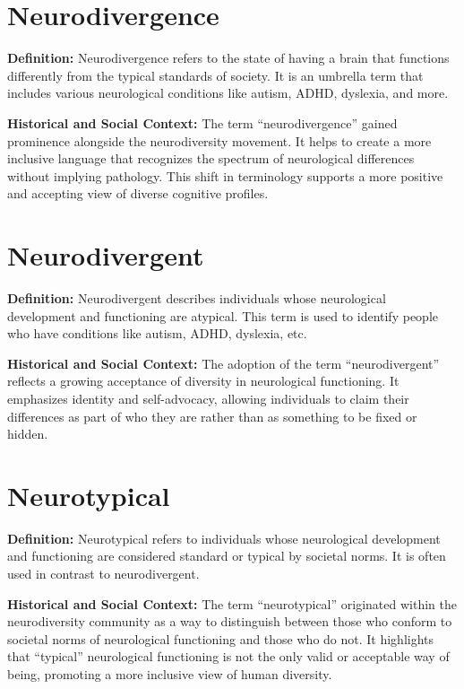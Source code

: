 \documentclass[
  letterpaper,
  DIV=11,
  numbers=noendperiod]{scrreprt}
\begin{document}
\section{Neurodivergence}\label{neurodivergence}

\textbf{Definition:} Neurodivergence refers to the state of having a
brain that functions differently from the typical standards of society.
It is an umbrella term that includes various neurological conditions
like autism, ADHD, dyslexia, and more.

\textbf{Historical and Social Context:} The term ``neurodivergence''
gained prominence alongside the neurodiversity movement. It helps to
create a more inclusive language that recognizes the spectrum of
neurological differences without implying pathology. This shift in
terminology supports a more positive and accepting view of diverse
cognitive profiles.

\section{Neurodivergent}\label{neurodivergent}

\textbf{Definition:} Neurodivergent describes individuals whose
neurological development and functioning are atypical. This term is used
to identify people who have conditions like autism, ADHD, dyslexia, etc.

\textbf{Historical and Social Context:} The adoption of the term
``neurodivergent'' reflects a growing acceptance of diversity in
neurological functioning. It emphasizes identity and self-advocacy,
allowing individuals to claim their differences as part of who they are
rather than as something to be fixed or hidden.

\section{Neurotypical}\label{neurotypical}

\textbf{Definition:} Neurotypical refers to individuals whose
neurological development and functioning are considered standard or
typical by societal norms. It is often used in contrast to
neurodivergent.

\textbf{Historical and Social Context:} The term ``neurotypical''
originated within the neurodiversity community as a way to distinguish
between those who conform to societal norms of neurological functioning
and those who do not. It highlights that ``typical'' neurological
functioning is not the only valid or acceptable way of being, promoting
a more inclusive view of human diversity.
\end{document}
